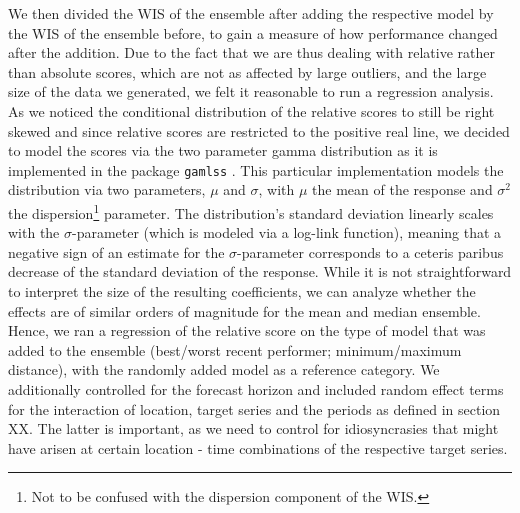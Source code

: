 


We then divided the WIS of the ensemble after adding the respective model by the WIS of the ensemble before, to gain a measure of how performance changed after the addition. Due to the fact that we are thus dealing with relative rather than absolute scores, which are not as affected by large outliers, and the large size of the data we generated, we felt it reasonable to run a regression analysis.  As we noticed the conditional distribution of the relative scores to still be right skewed and since relative scores are restricted to the positive real line, we decided to model the scores via the two parameter gamma distribution as it is implemented in the package \texttt{gamlss} \citep{rigby_generalized_2005}. This particular implementation models the distribution via two parameters, $\mu$ and $\sigma$, with $\mu$ the mean of the response and $\sigma^2$ the dispersion\footnote{Not to be confused with the dispersion component of the WIS.} parameter. The distribution's standard deviation linearly scales with the $\sigma$-parameter (which is modeled via a log-link function), meaning that a negative sign of an estimate for the $\sigma$-parameter corresponds to a ceteris paribus decrease of the standard deviation of the response. While it is not straightforward to interpret the size of the resulting coefficients, we can analyze whether the effects are of similar orders of magnitude for the mean and median ensemble.\\
Hence, we ran a regression of the relative score on the type of model that was added to the ensemble (best/worst recent performer; minimum/maximum distance), with the randomly added model as a reference category. We additionally controlled for the forecast horizon and included random effect terms for the interaction of location, target series and the periods as defined in section XX. The latter is important, as we need to control for idiosyncrasies that might have arisen at certain location - time combinations of the respective target series.\\
